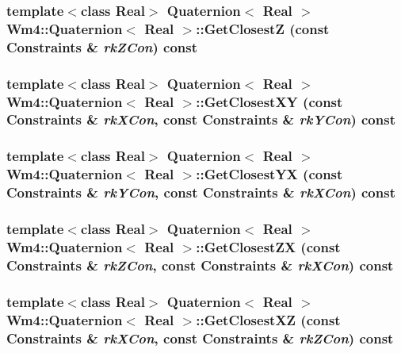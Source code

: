 \subsubsection{\setlength{\rightskip}{0pt plus 5cm}template$<$class Real$>$ {\bf Quaternion}$<$ Real $>$ {\bf Wm4::Quaternion}$<$ Real $>$::Get\-Closest\-Z (const {\bf Constraints} \& {\em rk\-ZCon}) const}\label{classWm4_1_1Quaternion_f5b0f63ffc089f0b62b4a5fe47e7f50e}


\subsubsection{\setlength{\rightskip}{0pt plus 5cm}template$<$class Real$>$ {\bf Quaternion}$<$ Real $>$ {\bf Wm4::Quaternion}$<$ Real $>$::Get\-Closest\-XY (const {\bf Constraints} \& {\em rk\-XCon}, const {\bf Constraints} \& {\em rk\-YCon}) const}\label{classWm4_1_1Quaternion_2c370f8a10467f94f68e444611b161ad}


\subsubsection{\setlength{\rightskip}{0pt plus 5cm}template$<$class Real$>$ {\bf Quaternion}$<$ Real $>$ {\bf Wm4::Quaternion}$<$ Real $>$::Get\-Closest\-YX (const {\bf Constraints} \& {\em rk\-YCon}, const {\bf Constraints} \& {\em rk\-XCon}) const}\label{classWm4_1_1Quaternion_abb2edebe0fd495fed9f2d8479cbf699}


\subsubsection{\setlength{\rightskip}{0pt plus 5cm}template$<$class Real$>$ {\bf Quaternion}$<$ Real $>$ {\bf Wm4::Quaternion}$<$ Real $>$::Get\-Closest\-ZX (const {\bf Constraints} \& {\em rk\-ZCon}, const {\bf Constraints} \& {\em rk\-XCon}) const}\label{classWm4_1_1Quaternion_a95edbc4adc16ef8879167e84fdfda7d}


\subsubsection{\setlength{\rightskip}{0pt plus 5cm}template$<$class Real$>$ {\bf Quaternion}$<$ Real $>$ {\bf Wm4::Quaternion}$<$ Real $>$::Get\-Closest\-XZ (const {\bf Constraints} \& {\em rk\-XCon}, const {\bf Constraints} \& {\em rk\-ZCon}) const}\label{classWm4_1_1Quaternion_b0424d935961db14096cec80ceb7c05d}


